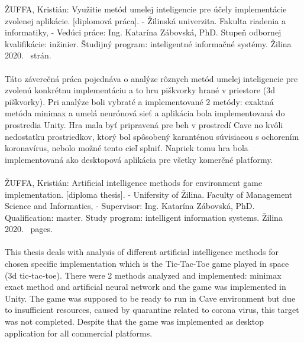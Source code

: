 ŽUFFA, Kristián: Využitie metód umelej inteligencie pre účely implementácie zvolenej aplikácie.
[diplomová práca].
- Žilinská univerzita.
Fakulta riadenia a informatiky, -
Vedúci práce: Ing. Katarína Zábovská, PhD.
Stupeň odbornej kvalifikácie: inžinier.
Študijný program: inteligentné informačné systémy.
Žilina 2020.~\pageref{LastPage} strán.
\\
\\
Táto záverečná práca pojednáva o analýze rôznych metód umelej inteligencie pre zvolenú konkrétnu implementáciu a to hru
piškvorky hrané v priestore (3d piškvorky).
Pri analýze boli vybraté a implementované 2 metódy: exaktná metóda minimax a umelá neurónová sieť a aplikácia bola
implementovaná do prostredia Unity.
Hra mala byť pripravená pre beh v prostredí Cave no kvôli nedostatku prostriedkov, ktorý bol spôsobený karanténou
súvisiacou s ochorením koronavírus, nebolo možné tento cieľ splniť.
Napriek tomu hra bola implementovaná ako desktopová aplikácia pre všetky komerčné platformy.
\\
\\

ŽUFFA, Kristián: Artificial intelligence methods for environment game implementation.
[diploma thesis].
- Unifersity of Žilina.
Faculty of Management Science and Informatics, -
Supervisor: Ing. Katarína Zábovská, PhD.
Qualification: master.
Study program: intelligent information systems.
Žilina 2020.~\pageref{LastPage} pages.
\\
\\
This thesis deals with analysis of different artificial intelligence methods for chosen specific implementation which
is the Tic-Tac-Toe game played in space (3d tic-tac-toe).
There were 2 methods analyzed and implemented: minimax exact method and artificial neural network and the game was
implemented in Unity.
The game was supposed to be ready to run in Cave environment but due to insufficient resources, caused by quarantine
related to corona virus, this target was not completed.
Despite that the game was implemented as desktop application for all commercial platforms.
\\

